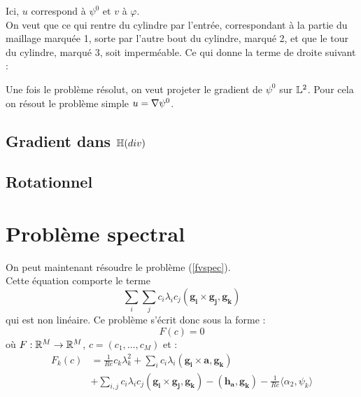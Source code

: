 Ici, $u$ correspond à $\psi^0$ et $v$ à $\varphi$.\\

On veut que ce qui rentre du cylindre par l'entrée, correspondant à la partie du maillage marquée 1, sorte par l'autre bout du cylindre, marqué 2, et que le tour du cylindre, marqué 3, soit imperméable. Ce qui donne la terme de droite suivant :



Une fois le problème résolut, on veut projeter le gradient de $\psi^0$ sur ${\mathbb{L}}^2$. Pour cela on résout le problème simple $u={\nabla}\psi^0$.



\subsection{Gradient dans ${\mathbb{H}}(div)$}

\subsection{Rotationnel}

\section{Problème spectral}

On peut maintenant résoudre le problème (\ref{fvspec}).\\
Cette équation comporte le terme
\[
\sum_i\sum_j c_i\lambda_i c_j(\mathbf{g_i}\times \mathbf{g_j}, \mathbf{g_k})
\]
qui est non linéaire. Ce problème s'écrit donc sous la forme :
\[
F(c) = 0
\]
où $F:{\mathbb{R}}^M\rightarrow{\mathbb{R}}^M$, $c=(c_1,\ldots, c_M)$ et :
\begin{align*}
F_k(c) &= \frac{1}{Re} c_k\lambda_k^2 + \sum_i c_i\lambda_i(\mathbf{g_i}\times \mathbf{a}, \mathbf{g_k})\\
&+ \sum_{i,j} c_i\lambda_i c_j (\mathbf{g_i}\times \mathbf{g_j}, \mathbf{g_k}) - (\mathbf{h_a},\mathbf{g_k}) - \frac{1}{Re}\langle \alpha_2, \psi_k \rangle
\end{align*}

